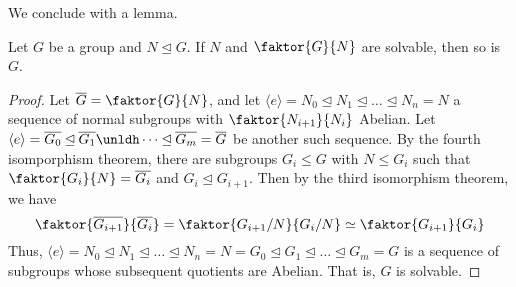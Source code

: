 We conclude with a lemma.

\begin{lemma}\label{lemma_3.5.6}
  Let $G$ be a group and  $N \unlhd G$. If  $N$ and  $\faktor{G}{N}$ are
  solvable, then so is $G$.
\end{lemma}
\begin{proof}
  Let $\bar{G}=\faktor{G}{N}$, and let $\langle e \rangle=N_0 \unlhd N_1
  \unlhd \dots \unlhd N_n=N$ a sequence of normal subgroups with
  $\faktor{N_{i+1}}{N_i}$ Abelian. Let $\langle e \rangle=\bar{G_0} \unlhd
  \bar{G_1} \unldh \dots \unlhd \bar{G_m}=\bar{G}$ be another such sequence.
  By the fourth isomporphism theorem, there are subgroups $G_i \leq G$ with
  $N \leq G_i$ such that $\faktor{G_i}{N}=\bar{G_i}$ and $G_i \unlhd G_{i+1}$.
  Then by the third isomorphism theorem, we have
  \begin{equation*}
    \faktor{\bar{G_{i+1}}}{\bar{G_i}}=\faktor{G_{i+1}/N}{G_i/N} \simeq
    \faktor{G_{i+1}}{G_i}
  \end{equation*}
  Thus, $\langle e \rangle=N_0 \unlhd N_1 \unlhd \dots \unlhd N_n=N=G_0 \unlhd G_1
  \unlhd \dots \unlhd G_m=G$ is a sequence of subgroups whose subsequent
  quotients are Abelian. That is, $G$ is solvable.
\end{proof}
